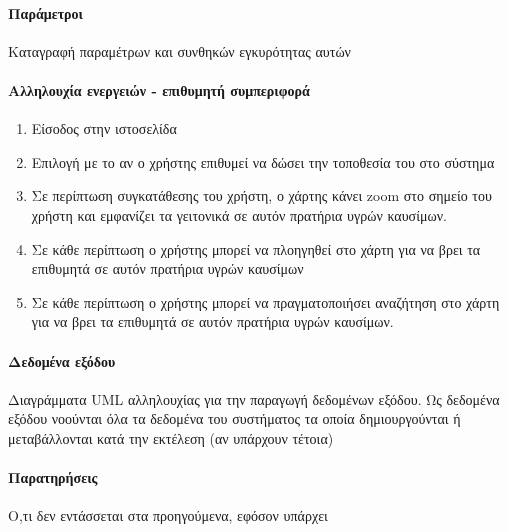 \paragraph{Παράμετροι}
Καταγραφή παραμέτρων και συνθηκών εγκυρότητας αυτών
\paragraph{Αλληλουχία ενεργειών - επιθυμητή συμπεριφορά}
\begin{enumerate}
	\item Είσοδος στην ιστοσελίδα
	\item Επιλογή με το αν ο χρήστης επιθυμεί να δώσει την τοποθεσία του στο σύστημα
	\item Σε περίπτωση συγκατάθεσης του χρήστη, ο χάρτης κάνει zoom στο σημείο του χρήστη και εμφανίζει τα γειτονικά σε αυτόν πρατήρια υγρών καυσίμων.
	\item Σε κάθε περίπτωση ο χρήστης μπορεί να πλοηγηθεί στο χάρτη για να βρει τα επιθυμητά σε αυτόν πρατήρια υγρών καυσίμων
	\item Σε κάθε περίπτωση ο χρήστης μπορεί να πραγματοποιήσει αναζήτηση στο χάρτη για να βρει τα επιθυμητά σε αυτόν πρατήρια υγρών καυσίμων.
\end{enumerate}
\paragraph{Δεδομένα εξόδου}
Διαγράμματα UML αλληλουχίας για την παραγωγή δεδομένων εξόδου. Ως δεδομένα εξόδου νοούνται όλα τα
δεδομένα του συστήματος τα οποία δημιουργούνται ή μεταβάλλονται κατά την εκτέλεση (αν υπάρχουν
τέτοια)
\paragraph{Παρατηρήσεις}
Ο,τι δεν εντάσσεται στα προηγούμενα, εφόσον υπάρχει
